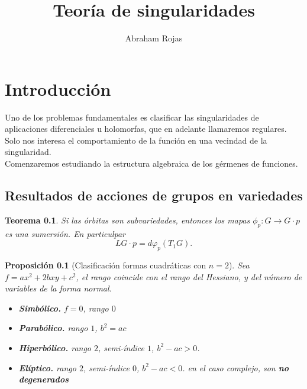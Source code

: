 \documentclass[12pt]{book}
\newtheorem{teo}{Teorema}
\newtheorem{pro}{Proposición}
\begin{document}
	\title{Teoría de singularidades}	
	\author{Abraham Rojas}
	\date{ }
	
	\maketitle
	\tableofcontents
	

	\chapter*{Introducción}
Uno de los problemas fundamentales es clasificar las singularidades de aplicaciones diferenciales u holomorfas, que en adelante llamaremos regulares.\\
Solo nos interesa el comportamiento de la función en una vecindad de la singularidad.\\

Comenzaremos estudiando la estructura algebraica de los gérmenes de funciones. 
	

\section{Resultados de acciones de grupos en variedades}

\begin{teo}
	Si las órbitas son subvariedades, entonces los mapas $\phi_p:G \rightarrow G\cdot p$ es una sumersión. En particulpar $$ LG \cdot p = d \varphi_p (T_1 G).  $$
\end{teo}



\begin{pro}[Clasificación formas cuadráticas con $n=2$]
Sea $f=ax^2 +2bxy + c^2$, el rango coincide con el rango del Hessiano, y del número de variables de la forma normal.
\begin{itemize}
\item \textbf{Simbólico.} $f=0$, rango $0$
\item \textbf{Parabólico.} rango $1$, $b^2=ac$
\item \textbf{Hiperbólico.} rango $2$, semi-índice $1$, $ b^2 -ac>0$.
\item \textbf{Elíptico.} rango $2$, semi-índice $0$, $ b^2 -ac<0$. en el caso complejo, son \textbf{no degenerados}
\end{itemize}
\end{pro}
\end{document}
